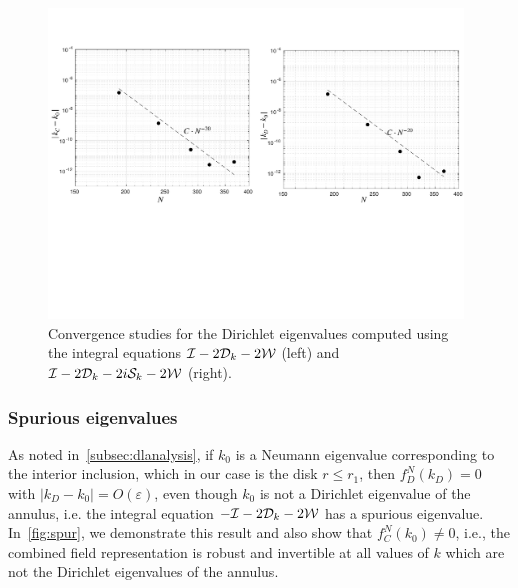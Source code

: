 \begin{figure}
  \centering
  \includegraphics[width=0.98\textwidth]{conv-studies.pdf}
  \caption{Convergence studies for the Dirichlet eigenvalues
  computed using the integral equations 
  $\mathcal I - 2{\mathcal D}_{k} - 2{\mathcal W}$ (left) and
  $\mathcal I - 2{\mathcal D}_{k} - 2i {\mathcal S}_{k} - 2{\mathcal W}$ (right).}
  \label{fig:conv}
\end{figure}

\subsubsection{Spurious eigenvalues}
\label{subsec:spurannulus}
As noted in~\cref{subsec:dlanalysis},
if $k_{0}$ is a Neumann eigenvalue corresponding to the interior
inclusion, which in our case is the disk $r\leq r_{1}$, then
$f_{D}^{N}(k_{D}) = 0$ with $|k_{D}-k_{0}| = O(\varepsilon)$, even though $k_{0}$ 
is not a Dirichlet eigenvalue of the annulus, i.e.
the integral equation $-\mathcal I - 2{\mathcal D}_{k} -2{\mathcal W}$ has a spurious eigenvalue.
In~\cref{fig:spur}, we demonstrate this result and also show that 
$f_{C}^{N}(k_{0}) \neq 0$, i.e., the combined field representation is
robust and invertible at all values of $k$ which are not the Dirichlet
eigenvalues of the annulus.

